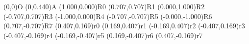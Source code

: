 \pstGeonode(0,0){O}
\pstGeonode(0,0.440){A}
\pstGeonode(1.000,0.000){R0}
\pstGeonode(0.707,0.707){R1}
\pstGeonode(0.000,1.000){R2}
\pstGeonode(-0.707,0.707){R3}
\pstGeonode(-1.000,0.000){R4}
\pstGeonode(-0.707,-0.707){R5}
\pstGeonode(-0.000,-1.000){R6}
\pstGeonode(0.707,-0.707){R7}
\pstGeonode(0.407,0.169){r0}
\pstGeonode(0.169,0.407){r1}
\pstGeonode(-0.169,0.407){r2}
\pstGeonode(-0.407,0.169){r3}
\pstGeonode(-0.407,-0.169){r4}
\pstGeonode(-0.169,-0.407){r5}
\pstGeonode(0.169,-0.407){r6}
\pstGeonode(0.407,-0.169){r7}

